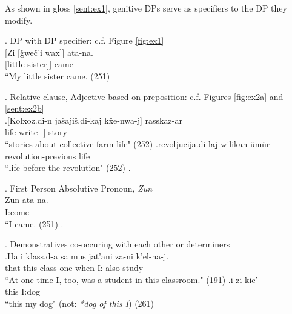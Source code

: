 As shown in gloss \ref{sent:ex1}, genitive DPs serve as specifiers to the DP they modify.

\ex. DP with DP specifier: c.f. Figure \ref{fig:ex1} \\ 
    \gll\label{sent:ex1}[Zi [\v{g}we\v{c}'i wax]] ata-na. \\
        [I:\Gen[] [little sister]] came-\Aori[] \\
        ``My little sister came. (251)

\ex. Relative clause, Adjective based on preposition: c.f. Figures \ref{fig:ex2a} and \ref{sent:ex2b} \\
    \ag.\label{sent:ex2a}[Kolxoz.di-n ja\v{s}aji\v{s}.di-kaj k\^{x}e-nwa-j] rasskaz-ar \\
        [kolkhoz-\Gen[] life-\Sbelc[] write-\Prf[]-\Ptcp[]] story-\Pl[] \\
        ``stories about collective farm life" (252)
    \bg.\label{sent:ex2b}revoljucija.di-laj wilikan \"{u}m\"{u}r \\
        revolution-\Srelc[] previous life \\
        ``life before the revolution" (252)
    \z.
    
\ex. First Person Absolutive Pronoun, \textit{Zun} \\ 
    \gll\label{sent:ex5}Zun ata-na. \\
        I:\Abs[] come-\Aori[] \\
        ``I came. (251)
    \z.
    
\ex. Demonstratives co-occuring with each other or determiners \\
    \ag.\label{sent:ex6a}Ha i klass.d-a sa mus jat'ani za-ni k'el-na-j. \\
    that this class-\Inessc[] one when \Indf[] I:\Erg[]-also study-\Aori[]-\Pst[] \\
    ``At one time I, too, was a student in this classroom." (191)
    \bg.\label{sent:ex6b}i zi kic' \\
    this I:\Gen[] dog \\
    ``this my dog" (not: \textit{*dog of this I}) (261)




